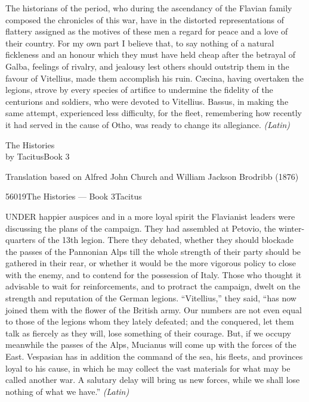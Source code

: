 
The historians of the period, who during the ascendancy of the Flavian family composed the chronicles of this war, have in the distorted representations of flattery assigned as the motives of these men a regard for peace and a love of their country. For my own part I believe that, to say nothing of a natural fickleness and an honour which they must have held cheap after the betrayal of Galba, feelings of rivalry, and jealousy lest others should outstrip them in the favour of Vitellius, made them accomplish his ruin. Cæcina, having overtaken the legions, strove by every species of artifice to undermine the fidelity of the centurions and soldiers, who were devoted to Vitellius. Bassus, in making the same attempt, experienced less difficulty, for the fleet, remembering how recently it had served in the cause of Otho, was ready to change its allegiance. \emph{(Latin)}


The Histories\\
by TacitusBook 3

Translation based on Alfred John Church and William Jackson Brodribb (1876)

56019The Histories — Book 3Tacitus


UNDER happier auspices and in a more loyal spirit the Flavianist leaders were discussing the plans of the campaign. They had assembled at Petovio, the winter-quarters of the 13th legion. There they debated, whether they should blockade the passes of the Pannonian Alps till the whole strength of their party should be gathered in their rear, or whether it would be the more vigorous policy to close with the enemy, and to contend for the possession of Italy. Those who thought it advisable to wait for reinforcements, and to protract the campaign, dwelt on the strength and reputation of the German legions. ``Vitellius,'' they said, ``has now joined them with the flower of the British army. Our numbers are not even equal to those of the legions whom they lately defeated; and the conquered, let them talk as fiercely as they will, lose something of their courage. But, if we occupy meanwhile the passes of the Alps, Mucianus will come up with the forces of the East. Vespasian has in addition the command of the sea, his fleets, and provinces loyal to his cause, in which he may collect the vast materials for what may be called another war. A salutary delay will bring us new forces, while we shall lose nothing of what we have.'' \emph{(Latin)}

